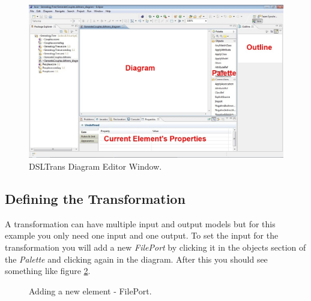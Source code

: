 \begin{figure}[h]
\begin{center}
  \includegraphics[width=\textwidth]{imgs/dsltrans_editor_window.jpg}
  \caption{DSLTrans Diagram Editor Window.}
  \label{fig:dsltrans_editor_window}
\end{center}
\end{figure}

\clearpage

\subsection{Defining the Transformation}

A transformation can have multiple input and output models but for this example
you only need one input and one output. To set the input for the transformation
you will add a new \emph{FilePort} by clicking it in the objects section of the
\emph{Palette} and clicking again in the diagram. After this you should see
something like figure \ref{fig:file_port_add}.


\begin{figure}[h]
\begin{center}
  \caption{Adding a new element - FilePort.}
  \label{fig:file_port_add}
\end{center}
\end{figure}

